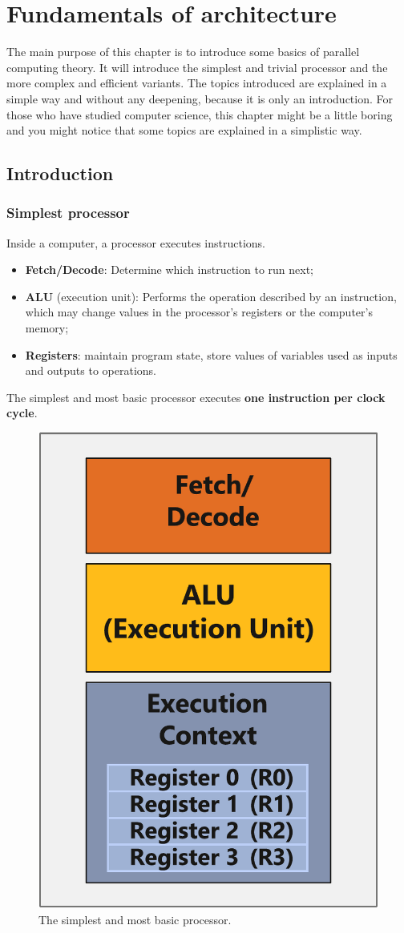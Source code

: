\section{Fundamentals of architecture}

The main purpose of this chapter is to introduce some basics of parallel computing theory. It will introduce the simplest and trivial processor and the more complex and efficient variants. The topics introduced are explained in a simple way and without any deepening, because it is only an introduction. For those who have studied computer science, this chapter might be a little boring and you might notice that some topics are explained in a simplistic way.

\longline

\subsection{Introduction}

\subsubsection{Simplest processor}

Inside a computer, a processor executes instructions.
\begin{itemize}
    \item \textbf{Fetch/Decode}: Determine which instruction to run next;
    \item \textbf{ALU} (execution unit): Performs the operation described by an instruction, which may change values in the processor's registers or the computer's memory;
    \item \textbf{Registers}: maintain program state, store values of variables used as inputs and outputs to operations.
\end{itemize}
The simplest and most basic processor executes \textbf{one instruction per clock cycle}.
\begin{figure}[!htp]
    \centering
    \includegraphics[width=.3\textwidth]{img/simplest-prcoessor-1.pdf}
    \caption{The simplest and most basic processor.}
\end{figure}

